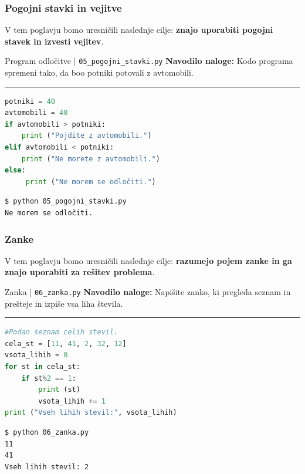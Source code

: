 \subsubsection{Pogojni stavki in vejitve}
\label{sec:pogojni_stavki_vejitve}

V tem poglavju bomo uresničili naslednje cilje: \textbf{znajo
  uporabiti pogojni stavek in izvesti vejitev}.

\begin{examplebox}[label={prog:pogojni}]{Program odločitve |
    \texttt{05\_pogojni\_stavki.py} \cite{web:PTHardWay}}
\textbf{Navodilo naloge:}
Kodo programa spremeni tako, da boo potniki potovali z avtomobili. 
\rule{\textwidth}{.4pt}
\begin{lstlisting}[language=Python]
potniki = 40
avtomobili = 40
if avtomobili > potniki:
    print ("Pojdite z avtomobili.")
elif avtomobili < potniki:
    print ("Ne morete z avtomobili.")
else:
     print ("Ne morem se odločiti.")
\end{lstlisting}
\tcblower
\begin{Verbatim}[fontsize=\footnotesize]
$ python 05_pogojni_stavki.py
Ne morem se odločiti.
\end{Verbatim}
\end{examplebox}

\subsubsection{Zanke}
\label{sec:zanke}

V tem poglavju bomo uresničili naslednje cilje: \textbf{razumejo pojem zanke
in ga znajo uporabiti za rešitev problema}.

\begin{examplebox}[label={prog:zanka}]{Zanka |
    \texttt{06\_zanka.py} \cite{web:PTHardWay}}
  \textbf{Navodilo naloge:}
  Napišite zanko, ki pregleda seznam in prešteje in izpiše vsa liha
  števila.
\rule{\textwidth}{.4pt}
\begin{lstlisting}[language=Python]
#Podan seznam celih stevil.
cela_st = [11, 41, 2, 32, 12]
vsota_lihih = 0
for st in cela_st:
    if st%2 == 1:
        print (st)
        vsota_lihih += 1
print ("Vseh lihih stevil:", vsota_lihih)
\end{lstlisting}
\tcblower
\begin{Verbatim}[fontsize=\footnotesize]
$ python 06_zanka.py
11
41
Vseh lihih stevil: 2
\end{Verbatim}
\end{examplebox}

